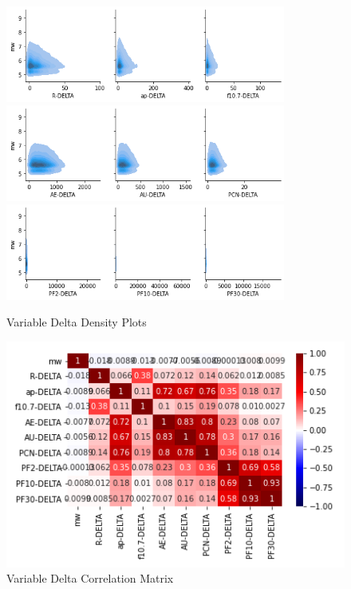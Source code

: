 \documentclass[12pt]{article}
\begin{document}
\begin{figure}
\centering
   \includegraphics[width=0.82\textwidth]{delta_kdeplot_1.png}
   \includegraphics[width=0.82\textwidth]{delta_kdeplot_2.png}
   \includegraphics[width=0.82\textwidth]{delta_kdeplot_3.png}
   \caption{Variable Delta Density Plots}

   \includegraphics{delta_heatmap.png}
   \caption{Variable Delta Correlation Matrix}
\end{figure}

\newpage
\end{document}
